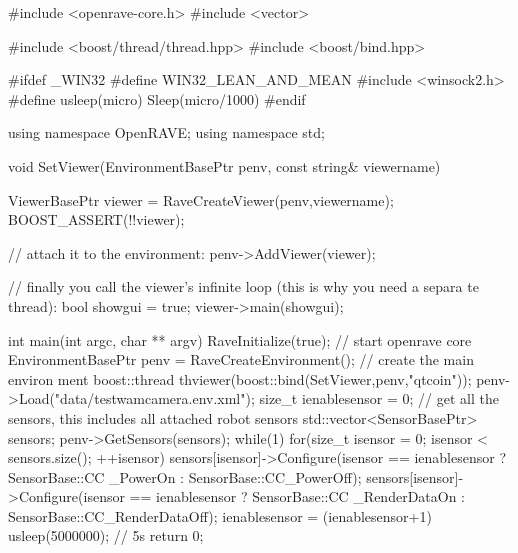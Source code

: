 \begin{DoxyCodeInclude}

#include <openrave-core.h>
#include <vector>

#include <boost/thread/thread.hpp>
#include <boost/bind.hpp>

#ifdef _WIN32
#define WIN32_LEAN_AND_MEAN
#include <winsock2.h>
#define usleep(micro) Sleep(micro/1000)
#endif

using namespace OpenRAVE;
using namespace std;

void SetViewer(EnvironmentBasePtr penv, const string& viewername)
{
    ViewerBasePtr viewer = RaveCreateViewer(penv,viewername);
    BOOST_ASSERT(!!viewer);

    // attach it to the environment:
    penv->AddViewer(viewer);

    // finally you call the viewer's infinite loop (this is why you need a separa
      te thread):
    bool showgui = true;
    viewer->main(showgui);
}

int main(int argc, char ** argv)
{
    RaveInitialize(true); // start openrave core
    EnvironmentBasePtr penv = RaveCreateEnvironment(); // create the main environ
      ment
    boost::thread thviewer(boost::bind(SetViewer,penv,"qtcoin"));
    penv->Load("data/testwamcamera.env.xml");
    size_t ienablesensor = 0;
    // get all the sensors, this includes all attached robot sensors
    std::vector<SensorBasePtr> sensors;
    penv->GetSensors(sensors);
    while(1) {
        for(size_t isensor = 0; isensor < sensors.size(); ++isensor) {
            sensors[isensor]->Configure(isensor == ienablesensor ? SensorBase::CC
      _PowerOn : SensorBase::CC_PowerOff);
            sensors[isensor]->Configure(isensor == ienablesensor ? SensorBase::CC
      _RenderDataOn : SensorBase::CC_RenderDataOff);
        }
        ienablesensor = (ienablesensor+1)%
        usleep(5000000); // 5s
    }
    return 0;
}
\end{DoxyCodeInclude}
 